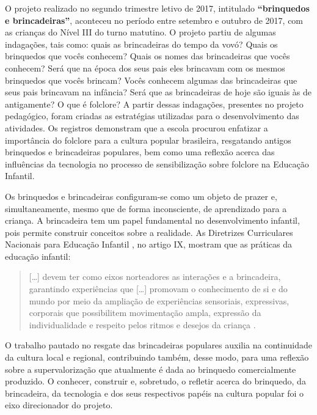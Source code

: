 \begin{refsection}
    O projeto realizado no segundo trimestre letivo de 2017, intitulado \textbf{“brinquedos e brincadeiras”}, aconteceu no período entre setembro e outubro de 2017, com as crianças do Nível III do turno matutino. O projeto partiu de algumas indagações, tais como: quais as brincadeiras do tempo da vovó? Quais os brinquedos que vocês conhecem? Quais os nomes das brincadeiras que vocês conhecem? Será que na época dos seus pais eles brincavam com os mesmos brinquedos que vocês brincam? Vocês conhecem algumas das brincadeiras que seus pais brincavam na infância? Será que as brincadeiras de hoje são iguais às de antigamente? O que é folclore? A partir dessas indagações, presentes no projeto pedagógico, foram criadas as estratégias utilizadas para o desenvolvimento das atividades. Os registros demonstram que a escola procurou enfatizar a importância do folclore para a cultura popular brasileira, resgatando antigos brinquedos e brincadeiras populares, bem como uma reflexão acerca das influências da tecnologia no processo de sensibilização sobre folclore na Educação Infantil.  

    Os brinquedos e brincadeiras configuram-se como um objeto de prazer e, simultaneamente, mesmo que de forma inconsciente, de aprendizado para a criança. A brincadeira tem um papel fundamental no desenvolvimento infantil, pois permite construir conceitos sobre a realidade. As Diretrizes Curriculares Nacionais para Educação Infantil \cite{Resolução5-2009}, no artigo IX, mostram que as práticas da educação infantil:

    \begin{quotation}
        [\dots] devem ter como eixos norteadores as interações e a brincadeira, garantindo experiências que [\dots] promovam o conhecimento de si e do mundo por meio da ampliação de experiências sensoriais, expressivas, corporais que possibilitem movimentação ampla, expressão da individualidade e respeito pelos ritmos e desejos da criança \cite[p.~25]{Resolução5-2009}. 
    \end{quotation}

    O trabalho pautado no resgate das brincadeiras populares auxilia na continuidade da cultura local e regional, contribuindo também, desse modo, para uma reflexão sobre a supervalorização que atualmente é dada ao brinquedo comercialmente produzido. O conhecer, construir e, sobretudo, o refletir acerca do brinquedo, da brincadeira, da tecnologia e dos seus respectivos papéis na cultura popular foi o eixo direcionador do projeto. 


\end{refsection}

